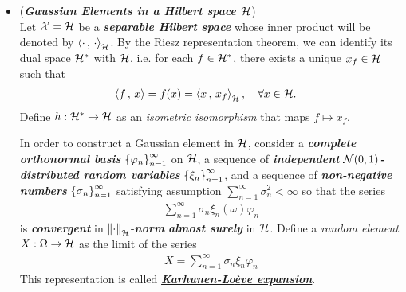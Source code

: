 \documentclass[11pt]{article}
\begin{document}
\begin{itemize}
\begin{example}
\end{example}

\item \begin{example} (\emph{\textbf{Gaussian Elements in a Hilbert space ${\mathcal H}$}})  \citep{lifshits2012lectures}\\
Let ${\mathcal X} = {\mathcal H}$ be a \emph{\textbf{separable Hilbert space}} whose inner product will be denoted by $\left\langle \cdot\,,\, \cdot \right\rangle_{{\mathcal H}}$. By the Riesz representation theorem, we can identify its dual space ${\mathcal H}^{*}$ with ${\mathcal H}$, i.e. for each $f \in {\mathcal H}^{*}$, there exists a unique $x_f \in {\mathcal H}$ such that
\begin{align*}
\left\langle f\,,\, x \right\rangle = f(x) &= \left\langle x\,,\, x_f \right\rangle_{{\mathcal H}}, \quad \forall x \in {\mathcal H}.
\end{align*} Define $h: {\mathcal H}^{*} \rightarrow {\mathcal H}$ as an \emph{isometric isomorphism} that maps $f \mapsto x_f$.

In order to construct a Gaussian element in ${\mathcal H}$, consider a \emph{\textbf{complete orthonormal basis}} $\left\{\varphi_n\right\}_{n=1}^{\infty}$ on ${\mathcal H}$, a  sequence of \emph{\textbf{independent}} \emph{\textbf{${\mathcal N}(0, 1)$-distributed random variables}} $\left\{\xi_n\right\}_{n=1}^{\infty}$, and a sequence of \emph{\textbf{non-negative numbers}} $\left\{\sigma_n\right\}_{n=1}^{\infty}$ satisfying assumption $\sum_{n=1}^{\infty}\sigma_n^2 < \infty$ so that the series
\begin{align*}
\sum_{n=1}^{\infty}\sigma_n  \xi_n(\omega) \varphi_n
\end{align*} is \emph{\textbf{convergent}} in $\left\|\cdot\right\|_{{\mathcal H}}$-\emph{\textbf{norm}}   \emph{\textbf{almost surely}} in ${\mathcal H}$. 
Define a \emph{random element} $X: \Omega \to {\mathcal H}$ as the limit of the series
\begin{align}
X=   \sum_{n=1}^{\infty}\sigma_n \xi_n \varphi_n \label{eqn: Gaussian_hilbert_space_expansion}
\end{align} 
This representation  is called \underline{\emph{\textbf{Karhunen-Lo{\`e}ve expansion}}}. 
 

\end{example}
\end{itemize}
\end{document}
